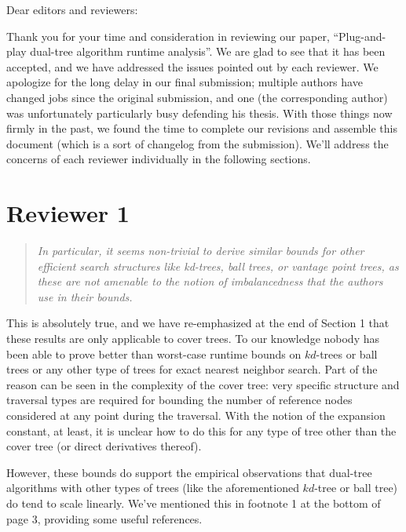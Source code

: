 \documentclass[twoside,11pt]{article}
\begin{document}
Dear editors and reviewers: \\

\medskip

Thank you for your time and consideration in reviewing our paper,
``Plug-and-play dual-tree algorithm runtime analysis''.  We are glad to see that
it has been accepted, and we have addressed the issues pointed out by each
reviewer.  We apologize for the long delay in our final submission; multiple
authors have changed jobs since the original submission, and one (the
corresponding author) was unfortunately particularly busy defending his thesis.
With those things now firmly in the past, we found the time to complete our
revisions and assemble this document (which is a sort of changelog from the
submission).  We'll address the concerns of each reviewer individually in the
following sections.

\medskip

\section{Reviewer 1}

\begin{quote}{\it
In particular, it seems non-trivial to derive similar bounds for other
efficient search structures like kd-trees, ball trees, or vantage point trees,
as these are not amenable to the notion of imbalancedness that the authors use
in their bounds.
}\end{quote}

This is absolutely true, and we have re-emphasized at the end of Section 1 that
these results are only applicable to cover trees.  To our knowledge nobody has
been able to prove better than worst-case runtime bounds on $kd$-trees or ball
trees or any other type of trees for exact nearest neighbor search.  Part of the
reason can be seen in the complexity of the cover tree: very specific structure
and traversal types are required for bounding the number of reference nodes
considered at any point during the traversal.  With the notion of the expansion
constant, at least, it is unclear how to do this for any type of tree other than
the cover tree (or direct derivatives thereof).

However, these bounds do support the empirical observations that dual-tree
algorithms with other types of trees (like the aforementioned $kd$-tree or ball
tree) do tend to scale linearly.  We've mentioned this in footnote 1 at the
bottom of page 3, providing some useful references.
\end{document}
